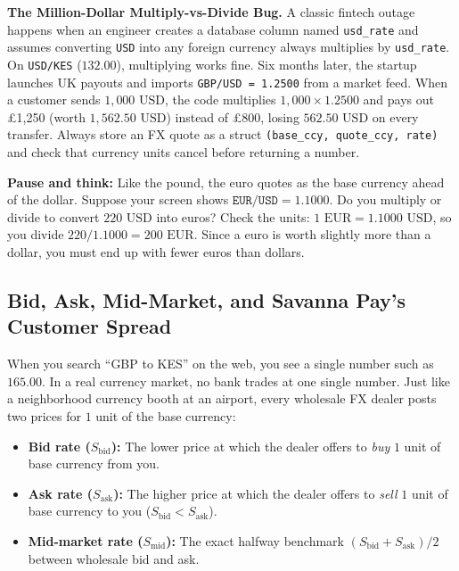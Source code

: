 \begin{trapbox}
\textbf{The Million-Dollar Multiply-vs-Divide Bug.} A classic fintech outage happens when an engineer creates a database column named \texttt{usd\_rate} and assumes converting \texttt{USD} into any foreign currency always multiplies by \texttt{usd\_rate}. On \texttt{USD/KES} ($132.00$), multiplying works fine. Six months later, the startup launches UK payouts and imports \texttt{GBP/USD = 1.2500} from a market feed. When a customer sends $1{,}000\text{ USD}$, the code multiplies $1{,}000 \times 1.2500$ and pays out \pounds 1,250 (worth $1{,}562.50\text{ USD}$) instead of \pounds 800, losing $562.50\text{ USD}$ on every transfer. Always store an FX quote as a struct \texttt{(base\_ccy, quote\_ccy, rate)} and check that currency units cancel before returning a number.
\end{trapbox}

\begin{recoverybox}
\textbf{Pause and think:} Like the pound, the euro quotes as the base currency ahead of the dollar. Suppose your screen shows $\texttt{EUR/USD} = 1.1000$. Do you multiply or divide to convert $220\text{ USD}$ into euros? Check the units: $1\text{ EUR} = 1.1000\text{ USD}$, so you divide $220 / 1.1000 = 200\text{ EUR}$. Since a euro is worth slightly more than a dollar, you must end up with fewer euros than dollars.
\end{recoverybox}

\subsection{Bid, Ask, Mid-Market, and Savanna Pay's Customer Spread}

When you search ``GBP to KES'' on the web, you see a single number such as $165.00$. In a real currency market, no bank trades at one single number. Just like a neighborhood currency booth at an airport, every wholesale FX dealer posts two prices for $1$ unit of the base currency:
\begin{itemize}
  \item \textbf{Bid rate ($S_{\text{bid}}$):} The lower price at which the dealer offers to \emph{buy} $1$ unit of base currency from you.
  \item \textbf{Ask rate ($S_{\text{ask}}$):} The higher price at which the dealer offers to \emph{sell} $1$ unit of base currency to you ($S_{\text{bid}} < S_{\text{ask}}$).
  \item \textbf{Mid-market rate ($S_{\text{mid}}$):} The exact halfway benchmark $(S_{\text{bid}} + S_{\text{ask}})/2$ between wholesale bid and ask.
\end{itemize}

